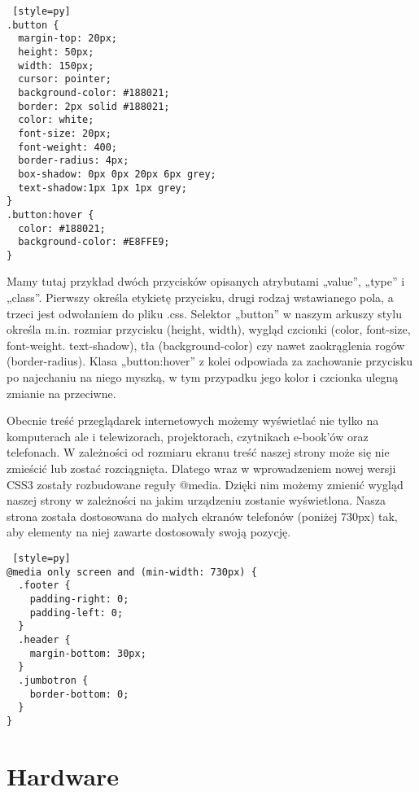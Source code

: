 \documentclass{xmgr}
\begin{document}
\begin{lstlisting} [style=py]
.button {
  margin-top: 20px;
  height: 50px;
  width: 150px;
  cursor: pointer;
  background-color: #188021;
  border: 2px solid #188021;
  color: white;
  font-size: 20px;
  font-weight: 400;
  border-radius: 4px;
  box-shadow: 0px 0px 20px 6px grey;
  text-shadow:1px 1px 1px grey;
}
.button:hover {
  color: #188021;
  background-color: #E8FFE9;
}
\end{lstlisting}

Mamy tutaj przykład dwóch przycisków opisanych atrybutami „value”, „type” i „class”. Pierwszy określa etykietę przycisku, drugi rodzaj wstawianego pola, a trzeci jest odwołaniem do pliku .css. Selektor „button” w naszym arkuszy stylu określa m.in. rozmiar przycisku (height, width), wygląd czcionki (color, font-size, font-weight. text-shadow), tła (background-color) czy nawet zaokrąglenia rogów (border-radius). Klasa „button:hover” z kolei odpowiada za zachowanie przycisku po najechaniu na niego myszką, w tym przypadku jego kolor i czcionka ulegną zmianie na przeciwne. 

 Obecnie treść przeglądarek internetowych możemy wyświetlać nie tylko na komputerach ale i telewizorach, projektorach, czytnikach e-book’ów oraz telefonach. W zależności od rozmiaru ekranu treść naszej strony może się nie zmieścić lub zostać rozciągnięta. Dlatego wraz w wprowadzeniem nowej wersji CSS3 zostały rozbudowane reguły @media. Dzięki nim możemy zmienić wygląd naszej strony w zależności na jakim urządzeniu zostanie wyświetlona. Nasza strona została dostosowana do małych ekranów telefonów (poniżej 730px) tak, aby elementy na niej zawarte dostosowały swoją pozycję. 

\hspace{2cm}
\begin{lstlisting} [style=py]
@media only screen and (min-width: 730px) {
  .footer {
    padding-right: 0;
    padding-left: 0;
  }
  .header {
    margin-bottom: 30px;
  }
  .jumbotron {
    border-bottom: 0;
  }
}
\end{lstlisting}


\chapter{Hardware\label{PRZEGLAD.NARZEDZI}}

\end{document}
